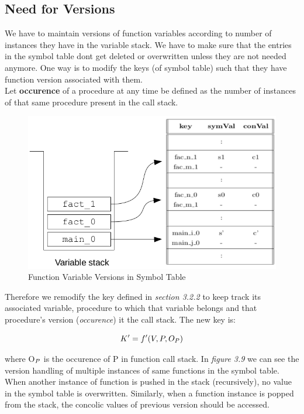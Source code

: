 \documentclass[12pt,oneside]{book}
\begin{document}
\subsection{Need for Versions}
We have to maintain versions of function variables according to number of instances they have in the variable stack. We have to make sure that the entries in the symbol table dont get deleted or overwritten unless they are not needed anymore. One way is to modify the keys (of symbol table) such that they have function version associated with them. \\
Let \textbf{occurence} of a procedure at any time be defined as the number of instances of that same procedure present in the call stack.\\

\vspace{0.4cm}
\begin{figure}[htbp]
\centering
\includegraphics[scale=0.50]{symtableandstack.png}
\caption{Function Variable Versions in Symbol Table}
\end{figure}
Therefore we remodify the key defined in \textit{section 3.2.2} to keep track its associated variable, procedure to which that variable belongs and that procedure's version (\textit{occurence}) it the call stack. The new key is:

\begin{equation}
K' = f'(V,P,O_{\tiny{P}})
\end{equation}

where O$_{\tiny{P}}$ is the occurence of P in function call stack.
In \textit{figure 3.9} we can see the version handling of multiple instances of same functions in the symbol table. When another instance of function is pushed in the stack (recursively), no value in the symbol table is overwritten. Similarly, when a function instance is popped from the stack, the concolic values of previous version should be accessed.
\end{document}
